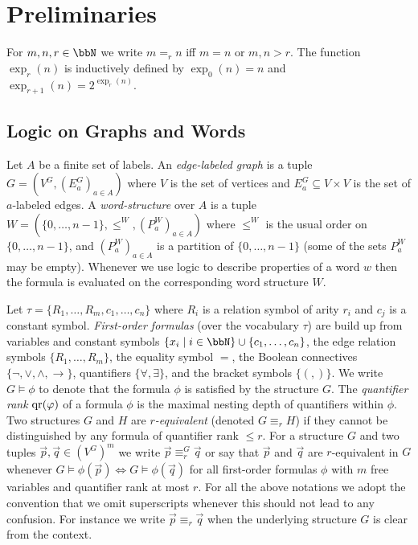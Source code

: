 \section{Preliminaries}
For $m,n,r\in\bbN$ we write $m =_r n$ iff $m=n$ or $m,n>r$. The function $\exp_{r}(n)$ is inductively defined by $\exp_0(n) = n$ and $\exp_{r+1}(n) = 2^{\exp_r(n)}$.

\subsection{Logic on Graphs and Words}
Let $A$ be a finite set of labels. An \emph{edge-labeled graph} is a tuple $G=(V^G,(E_a^G)_{a\in A})$ where $V$ is the set of vertices and $E_a^G \subseteq V\times V$ is the set of $a$-labeled edges. 
A \emph{word-structure} over $A$ is a tuple $W = (\{0,\ldots, n-1\}, \leq^W, (P_a^W)_{a\in A})$ where $\leq^W$ is the usual order on $\{0,\ldots,n-1\}$, and $(P_a^W)_{a\in A}$ is a partition of $\{0,\ldots, n-1\}$ (some of the sets $P_a^W$ may be empty). Whenever we use logic to describe properties of a word $w$ then the formula is evaluated on the corresponding word structure $W$. 

Let $\tau = \{R_1,\ldots,R_m, c_1, \ldots, c_n\}$ where $R_i$ is a relation symbol of arity $r_i$ and $c_j$ is a constant symbol.
\emph{First-order formulas} (over the vocabulary $\tau$) are build up
from variables and constant symbols $\{x_i \mid i\in \bbN \}\cup \{c_1,\ldots,c_n\}$, the edge relation symbols $\{R_1,\ldots, R_m\}$, the equality symbol $=$, the Boolean connectives
$\{\lnot,\vee,\wedge, \to \}$,
quantifiers $\{\forall, \exists \}$, and the bracket symbols
$\{(,) \}$. 
We write $G\models \phi$ to denote that the formula $\phi$ is satisfied by the structure $G$.
The \emph{quantifier rank} $\operatorname{qr}(\varphi)$ of a formula $\phi$
is the maximal nesting depth of quantifiers within $\phi$. Two structures
$G$ and $H$ are \emph{$r$-equivalent} (denoted $G\equiv_r H$) if they
cannot be distinguished by any formula of quantifier rank $\le r$. 
For a structure $G$ and two tuples $\vec{p}, \vec{q} \in (V^G)^m$ we write $\vec{p} \equiv_r^G \vec{q}$ or say that $\vec{p}$ and $\vec{q}$ are $r$-equivalent in $G$
whenever $G\models \phi(\vec{p}) \Leftrightarrow G\models\phi(\vec{q})$ for all first-order formulas $\phi$ with $m$ free variables and
quantifier rank at most $r$. For all the above notations we adopt the convention that we omit superscripts whenever this should not lead to any confusion. For instance we write 
$\vec{p} \equiv_r \vec{q}$ when the underlying structure $G$ is clear from the context. 

